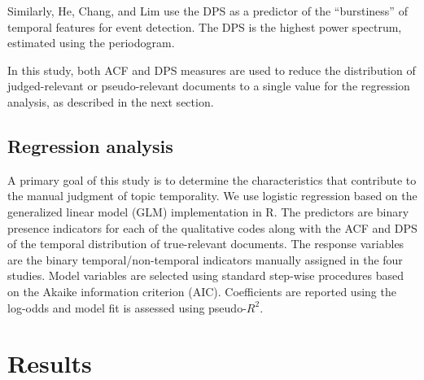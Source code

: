 \documentclass{sig-alternate-05-2015}
\begin{document}
Similarly, He, Chang, and Lim \cite{He2007} use the DPS as a predictor of the ``burstiness'' of temporal features for event detection. The DPS is the highest power spectrum, estimated using the periodogram.  

In this study, both ACF and DPS measures are used to reduce the distribution of judged-relevant or pseudo-relevant documents to a single value for the regression analysis, as described in the next section.

\subsection{Regression analysis}

A primary goal of this study is to determine the characteristics that contribute to the manual judgment of topic temporality. We use logistic regression based on the generalized linear model (GLM) implementation in R. The predictors are binary presence indicators for each of the qualitative codes along with the ACF and DPS of the temporal distribution of true-relevant documents.  The response variables are the binary temporal/non-temporal indicators manually assigned in the four studies.  Model variables are selected using standard step-wise procedures based on the Akaike information criterion (AIC). Coefficients are reported using the log-odds and model fit is assessed using pseudo-$R^2$.

\section{Results}

\end{document}
